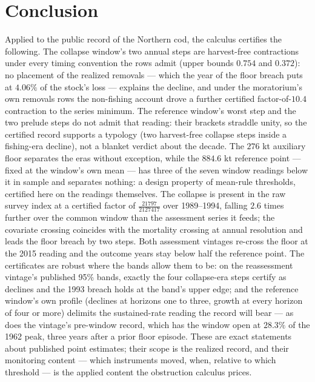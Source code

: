\documentclass[10pt,twocolumn]{article}
\theoremstyle{plain}
\theoremstyle{remark}
\begin{document}
\section{Conclusion}\label{conclusion}

Applied to the public record of the Northern cod, the calculus
certifies the following. The collapse window's two annual steps are
harvest-free contractions under every timing convention the rows admit
(upper bounds \(0.754\) and \(0.372\)): no placement of the realized
removals --- which the year of the floor breach puts at \(4.06\%\) of
the stock's loss --- explains the decline, and under the moratorium's
own removals rows the non-fishing account drove a further certified
factor-of-\(10.4\) contraction to the series minimum. The reference
window's worst step and the two prelude steps do not admit that
reading: their brackets straddle unity, so the certified record
supports a typology (two harvest-free collapse steps inside a
fishing-era decline), not a blanket verdict about the decade. The
\(276\) kt auxiliary floor separates the eras without exception,
while the \(884.6\) kt reference point --- fixed at the window's own
mean --- has three of the seven window readings below it in sample
and separates nothing: a design property of mean-rule thresholds,
certified here on the readings themselves. The collapse is present in
the raw survey index at a certified factor of
\(\tfrac{21797}{2127417}\) over 1989--1994, falling \(2.6\) times
further over the common window than the assessment series it feeds;
the covariate crossing coincides with the mortality crossing at annual
resolution and leads the floor breach by two steps. Both assessment
vintages re-cross the floor at the 2015 reading and the outcome years
stay below half the reference point. The certificates are robust
where the bands allow them to be: on the reassessment vintage's
published 95\% bands, exactly the four collapse-era steps certify as
declines and the 1993 breach holds at the band's upper edge; and the
reference window's own profile (declines at horizons one to three,
growth at every horizon of four or more) delimits the sustained-rate
reading the record will bear --- as does the vintage's pre-window
record, which has the window open at \(28.3\%\) of the 1962 peak,
three years after a prior floor episode. These are exact statements about
published point estimates; their scope is the realized record, and
their monitoring content --- which instruments moved, when, relative to
which threshold --- is the applied content the obstruction calculus
prices.
\end{document}
